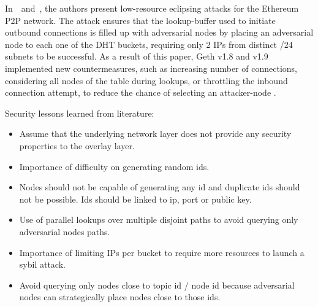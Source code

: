 In~\cite{marcus2018low}~and~\cite{henningsen2019eclipsing}, the authors present low-resource eclipsing attacks for the Ethereum P2P network. 
The attack ensures that the lookup-buffer used to initiate outbound connections is filled up with adversarial nodes by placing an adversarial node to each one of the DHT buckets, requiring only 2 IPs from distinct /24 subnets to be successful.
As a result of this paper, Geth v1.8 and v1.9 implemented new countermeasures, such as  increasing number of connections, considering all nodes of the table during lookups, or throttling the inbound connection attempt, to reduce the chance of selecting an attacker-node .





Security lessons learned from literature:
\begin{itemize}
\item Assume that the underlying network layer does not provide any security properties to the overlay layer.
\item Importance of difficulty on generating random ids.
\item Nodes should not be capable of generating any id and duplicate ids should not be possible. Ids should be linked to ip, port or public key.
\item Use of parallel lookups over multiple disjoint paths to avoid querying only  adversarial nodes paths.
\item Importance of limiting IPs per bucket to require more resources to launch a sybil attack.
\item Avoid querying only nodes close to topic id / node id because adversarial nodes can strategically place nodes close to those ids.
\end{itemize}


